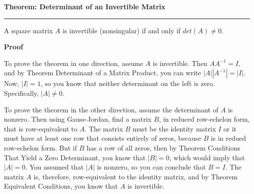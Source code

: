 \nopagenumbers
{\bf Theorem: Determinant of an Invertible Matrix}
\vskip 1mm
\hrule

\vskip 6pt
A square matrix $A$ is invertible (nonsingular) if and only if $det(A)\neq 0$.

\vskip 10pt
{\bf Proof}

\vskip 6pt
To prove the theorem in one direction, assume $A$ is invertible. Then $AA^{-1}=I$, and by Theorem Determinant of a Matrix Product, you can write $|A||A^{-1}|=|I|$. Now, $|I|=1$, so you know that neither determinant on the left is zero. Specifically, $|A|\neq 0$.

\vskip 1mm
To prove the theorem in the other direction, assume the determinant of $A$ is nonzero. Then using Gauss-Jordan, find a matrix $B$, in reduced row-echelon form, that is row-equivalent to $A$. The matrix $B$ must be the identity matrix $I$ or it must have at least one row that consists entirely of zeros, because $B$ is in redued row-echelon form. But if $B$ has a row of all zeros, then by Theorem Conditions That Yield a Zero Determinant, you know that $|B|=0$, which would imply that $|A|=0$. You assumed that $|A|$ is nonzero, so you can conclude that $B=I$. The matrix $A$ is, therefore, row-equivalent to the identity matrix, and by Theorem Equivalent Conditions, you know that $A$ is invertible.

\vfill\eject
\bye
